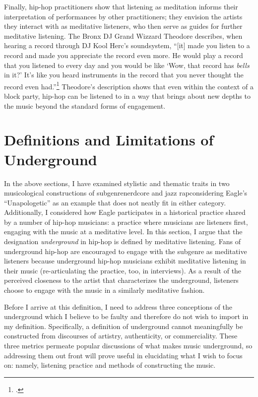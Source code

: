Finally, hip-hop practitioners show that listening as meditation informs their interpretation of performances 
by other practitioners; they envision the artists they interact with as meditative listeners, who then serve
as guides for further meditative listening. The Bronx DJ Grand Wizzard Theodore describes, when hearing a 
record through DJ Kool Herc's soundsystem, ``[it] made you listen to a record and made you appreciate the 
record even more. He would play a record that you listened to every day and you would be like `Wow, that 
record has \emph{bells} in it?' It's like you heard instruments in the record that you never thought the 
record even had.''\footnote{
    \autocite[139]{christabronGlassHiphopProduction2015}.} 
Theodore's description shows that even within the context of a block party, hip-hop can be listened to
in a way that brings about new depths to the music beyond the standard forms of engagement.

\section{Definitions and Limitations of Underground}

In the above sections, I have examined stylistic and thematic traits in two musicological 
constructions  of subgenre\textemdash nerdcore and jazz rap\textemdash considering Eagle's
``Unapologetic'' as an example that does not neatly fit in either category. Additionally, I
considered how Eagle participates in a historical practice shared by a number of hip-hop 
musicians: a practice where musicians are listeners first, engaging with the music at a meditative
level. In this section, I argue that the designation \emph{underground} in hip-hop is defined 
by meditative listening. Fans of underground hip-hop are encouraged to engage with the subgenre 
as meditative listeners because underground hip-hop musicians exhibit meditative listening in
their music (re-articulating the practice, too, in interviews). As a result of the perceived 
closeness to the artist that characterizes the underground, listeners choose to engage with
the music in a similarly meditative fashion.

Before I arrive at this definition, I need to address three conceptions of the underground 
which I believe to be faulty and therefore do not wish to import in my definition. Specifically,
a definition of underground cannot meaningfully be constructed from discourses of artistry, 
authenticity, or commerciality. These three metrics permeate popular discussions of what 
makes music underground, so addressing them out front will prove useful in elucidating what
I wish to focus on: namely, listening practice and methods of constructing the music.

